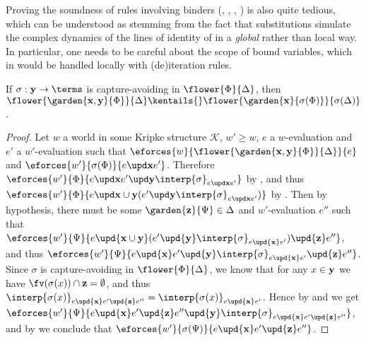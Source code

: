 Proving the soundness of rules involving binders (, ,
, ) is also quite tedious, which can be understood as
stemming from the fact that substitutions simulate the complex dynamics of the
lines of identity of  in a \emph{global} rather than local way. In particular,
one needs to be careful about the scope of bound variables, which in  would be
handled locally with (de)iteration rules.

\begin{lemma}
  
  If $\sigma : \by \to \terms$ is capture-avoiding in $\flower{\Phi}{\Delta}$,
  then $\flower{\garden{\bx, \by}{\Phi}}{\Delta} \kentails{}
  \flower{\garden{\bx}{\sigma(\Phi)}}{\sigma(\Delta)}$.
\end{lemma}
\begin{proof}
  Let $w$ a world in some Kripke structure $\mathcal{K}$, $w' \geq w$, $e$
  a $w$-evaluation and $e'$ a $w'$-evaluation such that
  $\eforces{w}{\flower{\garden{\bx,\by}{\Phi}}{\Delta}}{e}$ and
  $\eforces{w'}{\sigma(\Phi)}{\update{e}{\bx}{e'}}$. Therefore
  $\eforces{w'}{\Phi}{\update{e}{\bx}{\update{e'}{\by}{\interp{\sigma}_{\update{e}{\bx}{e'}}}}}$
  by , and thus $\eforces{w'}{\Phi}{\update{e}{\bx \cup
  \by}{(\update{e'}{\by}{\interp{\sigma}_{\update{e}{\bx}{e'}}})}}$ by
  . Then by hypothesis, there must be some
  $\garden{\bz}{\Psi} \in \Delta$ and $w'$-evaluation $e''$ such that
  $\eforces{w'}{\Psi}{e \upd{\bx \cup \by} (e' \upd{\by} \interp{\sigma}_{e
  \upd{\bx} e'}) \upd{\bz} e''}$, and thus $\eforces{w'}{\Psi}{e \upd{\bx} e'
  \upd{\by} \interp{\sigma}_{e \upd{\bx} e'} \upd{\bz} e''}$. Since $\sigma$ is
  capture-avoiding in $\flower{\Phi}{\Delta}$, we know that for any $x \in \mathbf{y}$
  we have $\fv(\sigma(x)) \cap \bz = \emptyset$, and thus $\interp{\sigma(x)}_{e
  \upd{\bx} e' \upd{\bz} e''} = \interp{\sigma(x)}_{e \upd{\bx} e'}$. Hence by
   and  we get $\eforces{w'}{\Psi}{e
  \upd{\bx} e' \upd{\bz} e'' \upd{\by} \interp{\sigma}_{e \upd{\bx} e' \upd{\bz}
  e''}}$, and by  we conclude that
  $\eforces{w'}{\sigma(\Psi)}{e \upd{\bx} e' \upd{\bz} e''}$.
\end{proof}

